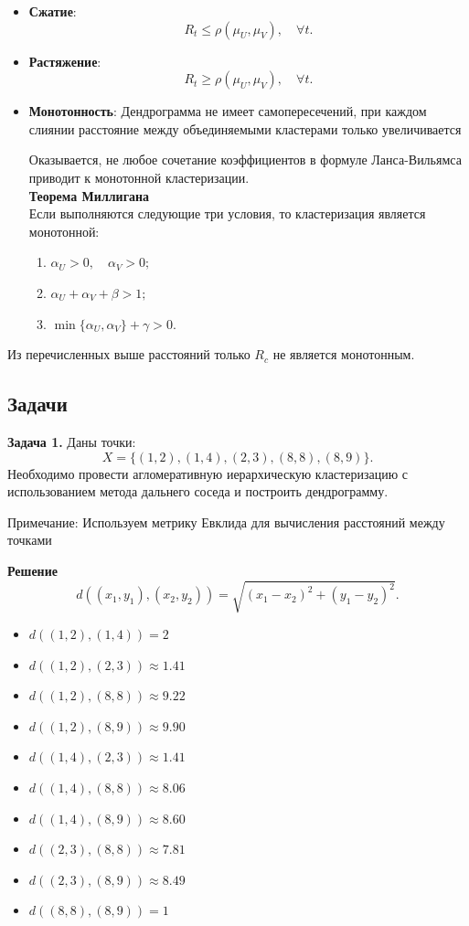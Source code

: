 \begin{itemize}

    \item \textbf{Сжатие}:
          \[
              R_t \leq \rho(\mu_U, \mu_V), \quad \forall t.
          \]
    \item \textbf{Растяжение}:
          \[
              R_t \ge \rho(\mu_U, \mu_V), \quad \forall t.
          \]
    \item \textbf{Монотонность}: Дендрограмма не имеет самопересечений, при каждом слиянии расстояние между объединяемыми кластерами только увеличивается
          
          Оказывается, не любое сочетание коэффициентов в формуле Ланса-Вильямса приводит к монотонной кластеризации. \\
          \textbf{Теорема Миллигана} \\
          Если выполняются следующие три условия, то кластеризация является монотонной:
          
          \begin{enumerate}
              \item \( \alpha_U > 0, \quad \alpha_V > 0; \)
              \item \( \alpha_U + \alpha_V + \beta > 1; \)
              \item  \( \min\{\alpha_U, \alpha_V\} + \gamma > 0. \)
          \end{enumerate}
\end{itemize}

Из перечисленных выше расстояний только \( R_c \) не является монотонным. 

\subsection{Задачи}
\textbf{Задача 1.}
Даны точки:
\[
    X = \{(1, 2), (1, 4), (2, 3), (8, 8), (8, 9)\}.
\]
Необходимо провести агломеративную иерархическую кластеризацию с использованием метода дальнего соседа и построить дендрограмму.

Примечание: Используем метрику Евклида для вычисления расстояний между точками

\textbf{Решение}
\[
    d((x_1, y_1), (x_2, y_2)) = \sqrt{(x_1 - x_2)^2 + (y_1 - y_2)^2}.
\]

\begin{itemize}
    \item \( d((1, 2), (1, 4)) = 2 \)
    \item \( d((1, 2), (2, 3)) \approx 1.41 \)
    \item \( d((1, 2), (8, 8)) \approx 9.22 \)
    \item \( d((1, 2), (8, 9)) \approx 9.90 \)
    \item \( d((1, 4), (2, 3)) \approx 1.41 \)
    \item \( d((1, 4), (8, 8)) \approx 8.06 \)
    \item \( d((1, 4), (8, 9)) \approx 8.60 \)
    \item \( d((2, 3), (8, 8)) \approx 7.81 \)
    \item \( d((2, 3), (8, 9)) \approx 8.49 \)
    \item \( d((8, 8), (8, 9)) = 1 \)
\end{itemize}

